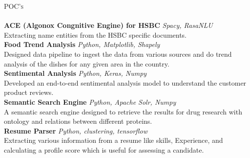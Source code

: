 \documentclass[a4paper]{article}
\newcommand{\lineunder} {
    \vspace*{-8pt} \\
    \hspace*{-18pt} \hrulefill \\
}
\newcommand{\header} [1] {
    {\hspace*{-18pt}\vspace*{6pt} \textsc{#1}}
    \vspace*{-6pt} \lineunder
}
\begin{document}
\header{POC's}
{\textbf{ACE (Algonox Congnitive Engine) for HSBC}} {\sl Spacy, RasaNLU} \\
Extracting name entities from the HSBC specific documents.\\
\vspace*{2mm}
{\textbf{Food Trend Analysis}} {\sl Python, Matplotlib, Shapely} \\
Designed data pipeline to ingest the data from various sources and do trend analysis of the dishes for
any given area in the country.\\
\vspace*{2mm}
{\textbf{Sentimental Analysis}} {\sl Python, Keras, Numpy} \\
Developed an end-to-end sentimental analysis model to understand the customer product reviews.\\
\vspace*{2mm}
{\textbf{Semantic Search Engine}} {\sl Python, Apache Solr, Numpy} \\
A semantic search engine designed to retrieve the results for drug research with ontology and relations
between different proteins.\\
\vspace*{2mm}
{\textbf{Resume Parser}} {\sl Python, clustering, tensorflow} \\
Extracting various information from a resume like skills, Experience, and calculating a profile score which is useful for assessing a candidate.\\


\ 
\end{document}

